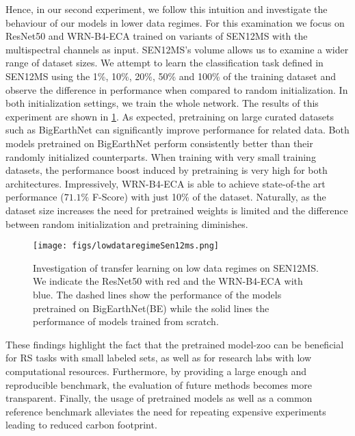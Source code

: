 \documentclass[journal]{IEEEtran}
\begin{document}
Hence, in our second experiment, we follow this intuition and investigate the behaviour of our models in lower data regimes. For this examination we focus on ResNet50 and WRN-B4-ECA trained on variants of SEN12MS with the multispectral channels as input. SEN12MS's volume allows us to examine a wider range of dataset sizes. We attempt to learn the classification task defined in SEN12MS using the 1\%, 10\%, 20\%, 50\% and 100\% of the training dataset and observe the difference in performance when compared to random initialization. In both initialization settings, we train the whole network. The results of this experiment are shown in \ref{fig:lowdataregime}. As expected, pretraining on large curated datasets such as BigEarthNet can significantly improve performance for related data. Both models pretrained on BigEarthNet perform consistently better than their randomly initialized counterparts. When training with very small training datasets, the performance boost induced by pretraining is very high for both architectures. Impressively, WRN-B4-ECA is able to achieve state-of-the art performance ($71.1\%$ F-Score) with just 10\% of the dataset. Naturally, as the dataset size increases the need for pretrained weights is limited and the difference between random initialization and pretraining diminishes.

\begin{figure}[!htp]
\centering
 \texttt{[image: figs/lowdataregimeSen12ms.png]}
\caption{ Investigation of transfer learning on low data regimes on SEN12MS. We indicate the ResNet50 with red and the WRN-B4-ECA with blue. The dashed lines show the performance of the models pretrained on BigEarthNet(BE) while the solid lines the performance of models trained from scratch.}
\label{fig:lowdataregime}
\end{figure}

These findings highlight the fact that the pretrained model-zoo can be beneficial for RS tasks with small labeled sets, as well as for research labs with low computational resources.
Furthermore, by providing a large enough and reproducible benchmark, the evaluation of future methods becomes more transparent. Finally, the usage of pretrained models as well as a common reference benchmark alleviates the need for repeating expensive experiments leading to reduced carbon footprint. 
\end{document}
